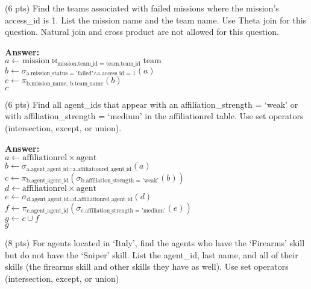 \begin{questions}
\vspace{15 mm}

\question (6 pts) Find the teams associated with failed missions where the mission's access\_id is 1. List the mission name and the team name. Use Theta join for this question. Natural join and cross product are not allowed for this question. 

\textbf{Answer:} \\
$a \leftarrow \text{mission} \bowtie_{\text{mission.team\_id = team.team\_id}} \text{team}$\\
$b \leftarrow \sigma_{\text{a.mission\_status = 'failed'} \land \text{a.access\_id = 1}}(a)$\\
$c \leftarrow \pi_{\text{b.mission\_name, b.team\_name}}(b)$\\
$c$

\vspace{15 mm}

\question (6 pts) Find all agent\_ids that appear with an affiliation\_strength = `weak' or with affiliation\_strength = `medium' in the affiliationrel table.  Use set operators (intersection, except, or union).

\textbf{Answer:} \\
$a \leftarrow \text{affiliationrel} \times \text{agent}$\\
$b \leftarrow \sigma_{\text{a.agent_agent\_id} = \text{a.affiliationrel_agent\_id}}(a)$\\
$c \leftarrow \pi_{\text{b.agent_agent\_id}} (\sigma_{\text{b.affiliation\_strength = 'weak'}}(b))$\\
$d \leftarrow \text{affiliationrel} \times \text{agent}$\\
$e \leftarrow \sigma_{\text{d.agent_agent\_id} = \text{d.affiliationrel_agent\_id}}(d)$\\
$f \leftarrow \pi_{\text{e.agent_agent\_id}} (\sigma_{\text{e.affiliation\_strength = 'medium'}}(e))$\\
$g \leftarrow c \cup f$\\
$g$


\vspace{15 mm}

\question (8 pts) For agents located in `Italy', find the agents who have the `Firearms' skill but do not have the `Sniper' skill. List the agent\_id, last name, and all of their skills (the firearms skill and other skills they have as well). Use set operators (intersection, except, or union)


\end{questions}
